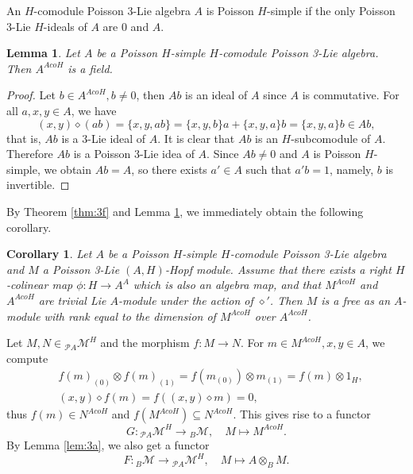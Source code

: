 \documentclass[11pt]{article}
\newtheorem{lemma}[theorem]{Lemma}
\newtheorem{corollary}[theorem]{Corollary}
\def\di{\diamond}
\def\ot{\otimes}
\begin{document}
An $H$-comodule Poisson 3-Lie algebra $A$ is Poisson $H$-simple if the only Poisson 3-Lie $H$-ideals of $A$ are 0 and $A$.

\begin{lemma}\label{lem:3g}
Let $A$ be a Poisson $H$-simple $H$-comodule Poisson 3-Lie algebra. Then $A^{AcoH}$ is a field.
\end{lemma}

\begin{proof}
Let $b\in A^{AcoH}, b\neq 0$, then $Ab$ is an ideal of $A$ since $A$ is commutative. For all $a,x,y\in A$, we have
$$(x,y)\di(ab)=\{x,y,ab\}=\{x,y,b\}a+\{x,y,a\}b=\{x,y,a\}b\in Ab,$$
that is, $Ab$ is a 3-Lie ideal of $A$. It is clear that $Ab$ is an $H$-subcomodule of $A$. Therefore $Ab$ is a Poisson 3-Lie idea of $A$. Since $Ab\neq0$ and $A$ is Poisson $H$-simple, we obtain $Ab=A$, so there exists $a'\in A$ such that $a'b=1$, namely, $b$ is invertible.
\end{proof}

By Theorem \ref{thm:3f} and Lemma \ref{lem:3g}, we immediately obtain the following corollary.

\begin{corollary}
Let $A$ be a Poisson $H$-simple $H$-comodule Poisson 3-Lie algebra and $M$ a Poisson 3-Lie $(A, H)$-Hopf module. Assume that there exists a right $H$-colinear map $\phi:H\rightarrow A^A$ which is also an algebra map, and that $M^{AcoH}$ and $A^{AcoH}$ are trivial Lie $A$-module under the action of $\di'$. Then $M$ is a free as an $A$-module with rank equal to the dimension of $M^{AcoH}$ over $A^{AcoH}$.
\end{corollary}


Let $M,N\in\! _{\mathcal{P}A}\mathcal{M}^H$ and the morphism $f:M\rightarrow N$. For $m\in M^{AcoH},x,y\in A$, we compute
\begin{align*}
&f(m)_{(0)}\ot f(m)_{(1)}=f(m_{(0)})\ot m_{(1)}=f(m)\ot 1_H,\\
&(x,y)\di f(m)=f((x,y)\di m)=0,
\end{align*}
thus $f(m)\in N^{AcoH}$ and $f(M^{AcoH})\subseteq N^{AcoH}$. This gives rise to a functor 
$$G:\!  _{\mathcal{P}A}\mathcal{M}^H\rightarrow \! _B\mathcal{M},\quad M\mapsto M^{AcoH}.$$
By Lemma \ref{lem:3a}, we also get a functor 
$$F:\! _B\mathcal{M}\rightarrow\!  _{\mathcal{P}A}\mathcal{M}^H,\quad M\mapsto A\ot_BM.$$
\end{document}
